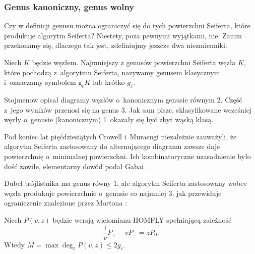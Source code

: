 
\subsubsection{Genus kanoniczny, genus wolny}
Czy w definicji genusu można ograniczyć się do tych powierzchni Seiferta, które produkuje algorytm Seiferta?
%
Niestety, poza pewnymi wyjątkami, nie.
Zanim przekonamy się, dlaczego tak jest, zdefiniujmy jeszcze dwa niezmienniki.

\begin{definition}
%
    Niech $K$ będzie węzłem.
    Najmniejszy z genusów powierzchni Seiferta węzła $K$, które pochodzą z~algorytmu Seiferta, nazywamy genusem klasycznym i~oznaczamy symbolem $\operatorname{g_c} K$ lub krótko $g_c$.
\end{definition}

Stojmenow \cite{stoimenow2008} opisał diagramy węzłów o~kanonicznym genusie równym 2.
%
Część z~jego wyników przenosi się na genus 3.
Jak sam pisze, sklasyfikowane wcześniej węzły o~genusie (kanonicznym) 1~okazały się być zbyt wąską klasą.

Pod koniec lat pięćdziesiątych Crowell i~Murasugi niezależnie zauważyli, że algorytm Seiferta zastosowany do alternującego diagramu zawsze daje powierzchnię o~minimalnej powierzchni.
%
%
Ich kombinatoryczne uzasadnienie było dość zawiłe, elementarny dowód podał Gabai \cite{gabai1986}.
%

Dubel trójlistnika ma genus równy $1$, ale algorytm Seiferta zastosowany wobec węzła produkuje powierzchnie o~genusie co najmniej $3$, jak przewiduje ograniczenie znalezione przez Mortona \cite[twierdzenie 2]{morton1986}:
%

\begin{proposition}
    Niech $P(v, z)$ będzie wersją wielomianu HOMFLY spełniającą zależność
    \begin{equation}
        \frac 1v P_+ - vP_- = zP_0.
    \end{equation}
    Wtedy $M = \max \deg_z P(v, z) \le 2g_c$.
%
\end{proposition}


